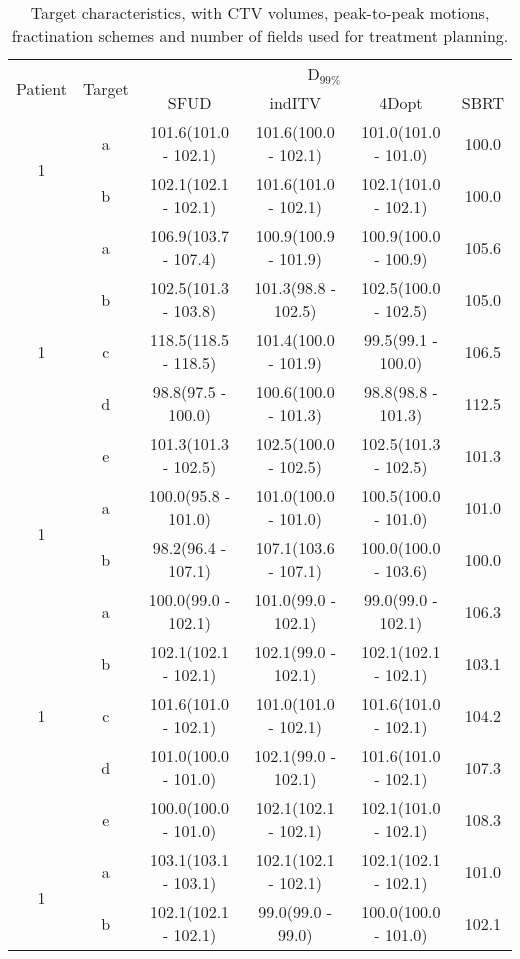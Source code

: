 \begin{table}[H]
	\centering
	\caption{Target characteristics, with CTV volumes, peak-to-peak motions, fractination schemes and number of fields used for treatment planning.}
	\begin{tabular}{c|c|c|c|c|c}
		\hline\hline
		\multirow{2}{*}{Patient} & \multirow{2}{*}{Target} & \multicolumn{4}{|c}{D$_{99\%}$} \\
		 & & SFUD & indITV & 4Dopt & SBRT \\
		 
\multirow{2}{*}{1} & a & 101.6(101.0 - 102.1) & 101.6(100.0 - 102.1) & 101.0(101.0 - 101.0) & 100.0\\ 
 & b & 102.1(102.1 - 102.1) & 101.6(101.0 - 102.1) & 102.1(101.0 - 102.1) & 100.0\\ 
\hline

\multirow{5}{*}{1} & a & 106.9(103.7 - 107.4) & 100.9(100.9 - 101.9) & 100.9(100.0 - 100.9) & 105.6\\ 
 & b & 102.5(101.3 - 103.8) & 101.3(98.8 - 102.5) & 102.5(100.0 - 102.5) & 105.0\\ 
 & c & 118.5(118.5 - 118.5) & 101.4(100.0 - 101.9) & 99.5(99.1 - 100.0) & 106.5\\ 
 & d & 98.8(97.5 - 100.0) & 100.6(100.0 - 101.3) & 98.8(98.8 - 101.3) & 112.5\\ 
 & e & 101.3(101.3 - 102.5) & 102.5(100.0 - 102.5) & 102.5(101.3 - 102.5) & 101.3\\ 
\hline

\multirow{2}{*}{1} & a & 100.0(95.8 - 101.0) & 101.0(100.0 - 101.0) & 100.5(100.0 - 101.0) & 101.0\\ 
 & b & 98.2(96.4 - 107.1) & 107.1(103.6 - 107.1) & 100.0(100.0 - 103.6) & 100.0\\ 
\hline

\multirow{5}{*}{1} & a & 100.0(99.0 - 102.1) & 101.0(99.0 - 102.1) & 99.0(99.0 - 102.1) & 106.3\\ 
 & b & 102.1(102.1 - 102.1) & 102.1(99.0 - 102.1) & 102.1(102.1 - 102.1) & 103.1\\ 
 & c & 101.6(101.0 - 102.1) & 101.0(101.0 - 102.1) & 101.6(101.0 - 102.1) & 104.2\\ 
 & d & 101.0(100.0 - 101.0) & 102.1(99.0 - 102.1) & 101.6(101.0 - 102.1) & 107.3\\ 
 & e & 100.0(100.0 - 101.0) & 102.1(102.1 - 102.1) & 102.1(101.0 - 102.1) & 108.3\\ 
\hline

\multirow{2}{*}{1} & a & 103.1(103.1 - 103.1) & 102.1(102.1 - 102.1) & 102.1(102.1 - 102.1) & 101.0\\ 
 & b & 102.1(102.1 - 102.1) & 99.0(99.0 - 99.0) & 100.0(100.0 - 101.0) & 102.1\\ 
\hline


\end{tabular}
\end{table}
